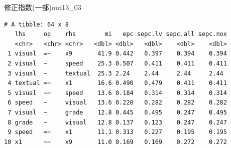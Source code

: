 \begin{Rscreen}{修正指数(一部)}{out13_03}
	\begin{verbatim}
# A tibble: 64 x 8
   lhs     op    rhs        mi   epc sepc.lv sepc.all sepc.nox
   <chr>   <chr> <chr>   <dbl> <dbl>   <dbl>    <dbl>    <dbl>
 1 visual  =~    x9       41.9 0.442   0.397    0.394    0.394
 2 visual  ~     speed    25.3 0.507   0.411    0.411    0.411
 3 visual  ~     textual  25.3 2.24    2.44     2.44     2.44 
 4 textual =~    x1       16.6 0.490   0.479    0.411    0.411
 5 visual  ~~    speed    13.6 0.184   0.314    0.314    0.314
 6 speed   ~     visual   13.6 0.228   0.282    0.282    0.282
 7 visual  ~     grade    12.8 0.445   0.495    0.247    0.495
 8 grade   ~     visual   12.8 0.137   0.123    0.247    0.247
 9 speed   =~    x1       11.1 0.313   0.227    0.195    0.195
10 x1      ~~    x9       11.0 0.169   0.169    0.272    0.272
\end{verbatim}
\end{Rscreen}
